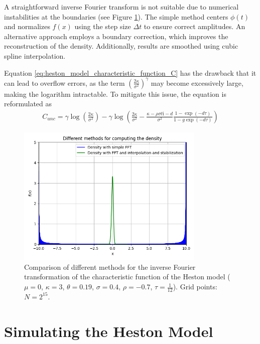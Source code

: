 A straightforward inverse Fourier transform is not suitable due to numerical instabilities at the boundaries (see Figure \ref{fig:ifft_comparison}). The simple method centers $\phi(t)$ and normalizes $f(x)$ using the step size $\Delta t$ to ensure correct amplitudes. An alternative approach employs a boundary correction, which improves the reconstruction of the density. Additionally, results are smoothed using cubic spline interpolation.

Equation \eqref{eq:heston_model_characteristic_function_C} has the drawback that it can lead to overflow errors, as the term $\left(\frac{2\kappa}{\sigma^2}\right)^\gamma$ may become excessively large, making the logarithm intractable. To mitigate this issue, the equation is reformulated as
\begin{align}
    \label{eq:heston_model_characteristic_function_C_2}
    C_{unc} = \gamma \log\left(\frac{2\kappa}{\sigma^2}\right) - \gamma \log\left(\frac{2\kappa}{\sigma^2} - \frac{\kappa - \rho\sigma t \mathrm{i} - d}{\sigma^2} \frac{1 - \exp(-d \tau)}{1 - g \exp(-d \tau)}\right)
\end{align}

\begin{figure}[h]
    \centering
    \includegraphics[width=0.8\textwidth]{img/different_ifft_methods.png}
    \caption{Comparison of different methods for the inverse Fourier transformation of the characteristic function of the Heston model ($\mu=0$, $\kappa=3$, $\theta=0.19$, $\sigma=0.4$, $\rho=-0.7$, $\tau=\frac{1}{12}$). Grid points: $N=2^{15}$.}
    \label{fig:ifft_comparison}
\end{figure}

\section{Simulating the Heston Model}

